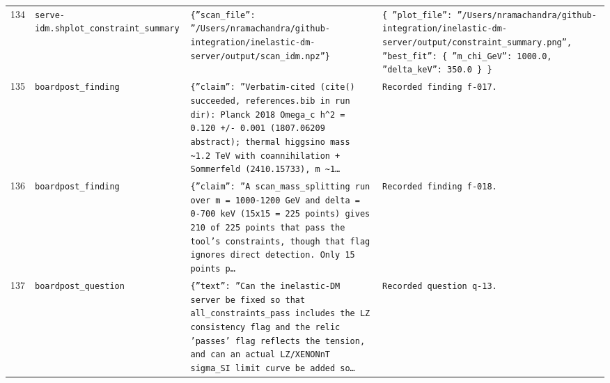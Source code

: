 \documentclass[11pt,a4paper]{article}
\begin{document}
\begin{longtable}{@{}p{}p{}p{}p{}@{}}
134 & \texttt{serve-idm.sh}\newline\texttt{plot\_\allowbreak{}constraint\_\allowbreak{}summary} & \texttt{\{''scan\_\allowbreak{}file'':\allowbreak{} ''/\allowbreak{}Users/\allowbreak{}nramachandra/\allowbreak{}github-integration/\allowbreak{}inelastic-dm-server/\allowbreak{}output/\allowbreak{}scan\_\allowbreak{}idm.npz''\}\allowbreak{}} & \texttt{\{   ''plot\_\allowbreak{}file'':\allowbreak{} ''/\allowbreak{}Users/\allowbreak{}nramachandra/\allowbreak{}github-integration/\allowbreak{}inelastic-dm-server/\allowbreak{}output/\allowbreak{}constraint\_\allowbreak{}summary.png'',\allowbreak{}   ''best\_\allowbreak{}fit'':\allowbreak{} \{     ''m\_\allowbreak{}chi\_\allowbreak{}GeV'':\allowbreak{} 1000.0,\allowbreak{}     ''delta\_\allowbreak{}keV'':\allowbreak{} 350.0   \}\allowbreak{} \}\allowbreak{}} \\
135 & \texttt{board}\newline\texttt{post\_\allowbreak{}finding} & \texttt{\{''claim'':\allowbreak{} ''Verbatim-cited (cite()\allowbreak{} succeeded,\allowbreak{} references.bib in run dir)\allowbreak{}:\allowbreak{} Planck 2018 Omega\_\allowbreak{}c h\textasciicircum{}\allowbreak{}2 =\allowbreak{} 0.120 +/\allowbreak{}- 0.001 (1807.06209 abstract)\allowbreak{};\allowbreak{} thermal higgsino mass \textasciitilde{}\allowbreak{}1.2 TeV with coannihilation + Sommerfeld (2410.15733)\allowbreak{},\allowbreak{} m \textasciitilde{}\allowbreak{}1\ldots{}\allowbreak{}} & \texttt{Recorded finding f-017.} \\
136 & \texttt{board}\newline\texttt{post\_\allowbreak{}finding} & \texttt{\{''claim'':\allowbreak{} ''A scan\_\allowbreak{}mass\_\allowbreak{}splitting run over m =\allowbreak{} 1000-1200 GeV and delta =\allowbreak{} 0-700 keV (15x15 =\allowbreak{} 225 points)\allowbreak{} gives 210 of 225 points that pass the tool's constraints,\allowbreak{} though that flag ignores direct detection. Only 15 points p\ldots{}\allowbreak{}} & \texttt{Recorded finding f-018.} \\
137 & \texttt{board}\newline\texttt{post\_\allowbreak{}question} & \texttt{\{''text'':\allowbreak{} ''Can the inelastic-DM server be fixed so that all\_\allowbreak{}constraints\_\allowbreak{}pass includes the LZ consistency flag and the relic 'passes' flag reflects the tension,\allowbreak{} and can an actual LZ/\allowbreak{}XENONnT sigma\_\allowbreak{}SI limit curve be added so\ldots{}\allowbreak{}} & \texttt{Recorded question q-13.} \\

\end{longtable}
\end{document}
